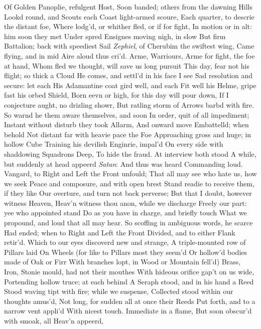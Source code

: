 \documentclass[11pt]{book}
\begin{document}
Of Golden Panoplie, refulgent Host, 
Soon banded; others from the dawning Hills 
Lookd round, and Scouts each Coast light-armed scoure, 
Each quarter, to descrie the distant foe, 
Where lodg'd, or whither fled, or if for fight, 
In motion or in alt: him soon they met 
Under spred Ensignes moving nigh, in slow 
But firm Battalion; back with speediest Sail 
\textit{Zephiel}, of Cherubim the swiftest wing, 
Came flying, and in mid Aire aloud thus cri'd. 
\quad Arme, Warriours, Arme for fight, the foe at hand, 
Whom fled we thought, will save us long pursuit 
This day, fear not his flight; so thick a Cloud 
He comes, and settl'd in his face I see 
Sad resolution and secure: let each 
His Adamantine coat gird well, and each 
Fit well his Helme, gripe fast his orbed Shield, 
Born eevn or high, for this day will pour down, 
If I conjecture aught, no drizling showr, 
But ratling storm of Arrows barbd with fire. 
So warnd he them aware themselves, and soon 
In order, quit of all impediment; 
Instant without disturb they took Allarm, 
And onward move Embattelld; when behold 
Not distant far with heavie pace the Foe 
Approaching gross and huge; in hollow Cube 
Training his devilish Enginrie, impal'd 
On every side with shaddowing Squadrons Deep, 
To hide the fraud.  At interview both stood 
A while, but suddenly at head appeerd 
\textit{Satan}: And thus was heard Commanding loud. 
\quad Vangard, to Right and Left the Front unfould; 
That all may see who hate us, how we seek 
Peace and composure, and with open brest 
Stand readie to receive them, if they like 
Our overture, and turn not back perverse; 
But that I doubt, however witness Heaven, 
Heav'n witness thou anon, while we discharge 
Freely our part: yee who appointed stand 
Do as you have in charge, and briefly touch 
What we propound, and loud that all may hear. 
\quad So scoffing in ambiguous words, he scarce 
Had ended; when to Right and Left the Front 
Divided, and to either Flank retir'd. 
Which to our eyes discoverd new and strange, 
A triple-mounted row of Pillars laid 
On Wheels (for like to Pillars most they seem'd 
Or hollow'd bodies made of Oak or Firr 
With branches lopt, in Wood or Mountain fell'd) 
Brass, Iron, Stonie mould, had not their mouthes 
With hideous orifice gap't on us wide, 
Portending hollow truce; at each behind 
A Seraph stood, and in his hand a Reed 
Stood waving tipt with fire; while we suspense, 
Collected stood within our thoughts amus'd, 
Not long, for sudden all at once their Reeds 
Put forth, and to a narrow vent appli'd 
With nicest touch.  Immediate in a flame, 
But soon obscur'd with smoak, all Heav'n appeerd, 
\end{document}
